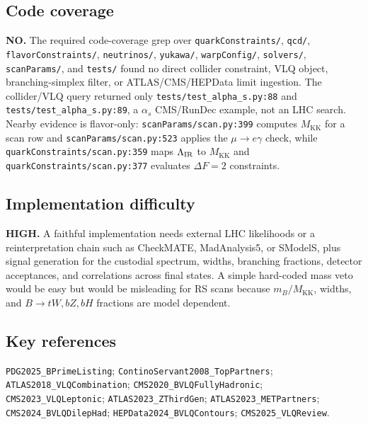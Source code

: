 \subsection*{Code coverage}
\textbf{NO.}  The required code-coverage grep over \texttt{quarkConstraints/},
\texttt{qcd/}, \texttt{flavorConstraints/}, \texttt{neutrinos/},
\texttt{yukawa/}, \texttt{warpConfig/}, \texttt{solvers/},
\texttt{scanParams/}, and \texttt{tests/} found no direct collider
constraint, VLQ object, branching-simplex filter, or ATLAS/CMS/HEPData limit
ingestion.  The collider/VLQ query returned only
\texttt{tests/test\_alpha\_s.py:88} and \texttt{tests/test\_alpha\_s.py:89},
a \(\alpha_s\) CMS/RunDec example, not an LHC search.  Nearby evidence is
flavor-only: \texttt{scanParams/scan.py:399} computes \(M_{\mathrm{KK}}\) for
a scan row and \texttt{scanParams/scan.py:523} applies the \(\mu\to e\gamma\)
check, while \texttt{quarkConstraints/scan.py:359} maps
\(\Lambda_{\rm IR}\) to \(M_{\mathrm{KK}}\) and
\texttt{quarkConstraints/scan.py:377} evaluates \(\Delta F=2\) constraints.

\subsection*{Implementation difficulty}
\textbf{HIGH.}  A faithful implementation needs external LHC likelihoods or
a reinterpretation chain such as CheckMATE, MadAnalysis5, or SModelS, plus
signal generation for the custodial spectrum, widths, branching fractions,
detector acceptances, and correlations across final states.  A simple
hard-coded mass veto would be easy but would be misleading for RS scans
because \(m_B/M_{\mathrm{KK}}\), widths, and \(B\to tW,bZ,bH\) fractions are
model dependent.

\subsection*{Key references}
\texttt{PDG2025\_BPrimeListing};
\texttt{ContinoServant2008\_TopPartners};
\texttt{ATLAS2018\_VLQCombination};
\texttt{CMS2020\_BVLQFullyHadronic};
\texttt{CMS2023\_VLQLeptonic};
\texttt{ATLAS2023\_ZThirdGen};
\texttt{ATLAS2023\_METPartners};
\texttt{CMS2024\_BVLQDilepHad};
\texttt{HEPData2024\_BVLQContours};
\texttt{CMS2025\_VLQReview}.
